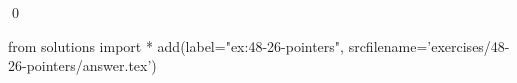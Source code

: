 
\begin{ex}
  \label{ex:48-26-pointers}
  
  \qed
\end{ex}
\begin{python0}
from solutions import *
add(label="ex:48-26-pointers",
    srcfilename='exercises/48-26-pointers/answer.tex')
\end{python0}
